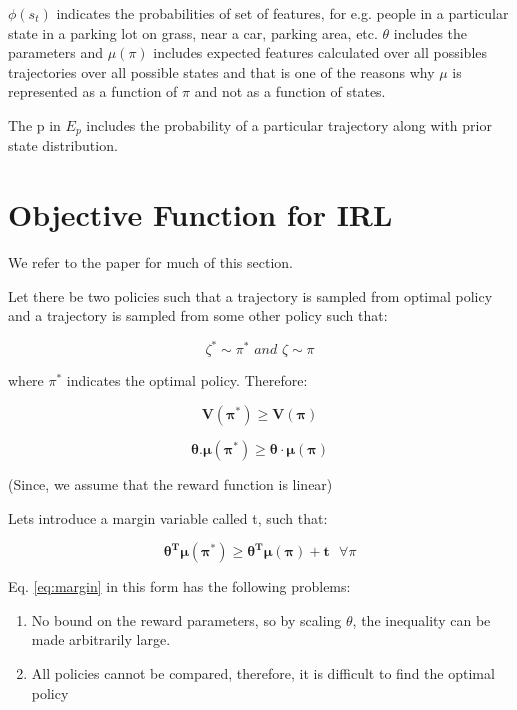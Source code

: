 \documentclass[11pt]{article}
\begin{document}
$\phi(s_t)$ indicates the probabilities of set of features, for e.g. people in a particular state in a parking lot on grass, near a car, parking area, etc. $\theta$ includes the parameters and $\mu(\pi)$ includes expected features calculated over all possibles trajectories over all possible states and that is one of the reasons why $\mu$ is represented as a function of $\pi$ and not as a function of states.

The p in $E_p$ includes the probability of a particular trajectory along with prior state distribution.

\section{Objective Function for IRL}

We refer to the \cite{abbeel2004apprenticeship} paper for much of this section.

Let there be two policies such that a trajectory is sampled from optimal policy and a trajectory is sampled from some other policy such that:

\begin{equation}
\zeta^* \sim \pi^* \textit{ and } \zeta \sim \pi
\end{equation}

where $\pi^*$ indicates the optimal policy. Therefore:

\begin{equation}
\mathbf{V(\pi^*)\geq V(\pi)}
\end{equation}

\begin{equation}
\mathbf{\theta.\mu(\pi^*)\geq \theta\cdot\mu(\pi)}
\end{equation}

(Since, we assume that the reward function is linear)


Lets introduce a margin variable called t, such that:


\begin{equation}\label{eq:margin}
    \mathbf{\theta^T\mu(\pi^*)\geq \theta^T\mu(\pi)+t} \texttt{ }\forall \pi
\end{equation}


Eq. \ref{eq:margin} in this form has the following problems:
\begin{enumerate}
    \item  No bound on the reward parameters, so by scaling $\theta$, the inequality can be made arbitrarily large.
    \item All policies cannot be compared, therefore, it is difficult to find the optimal policy
\end{enumerate}
\end{document}
